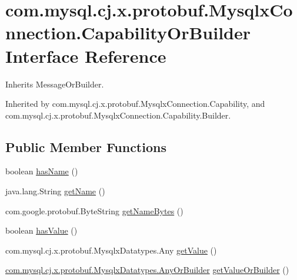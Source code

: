 \hypertarget{interfacecom_1_1mysql_1_1cj_1_1x_1_1protobuf_1_1_mysqlx_connection_1_1_capability_or_builder}{}\section{com.\+mysql.\+cj.\+x.\+protobuf.\+Mysqlx\+Connection.\+Capability\+Or\+Builder Interface Reference}
\label{interfacecom_1_1mysql_1_1cj_1_1x_1_1protobuf_1_1_mysqlx_connection_1_1_capability_or_builder}


Inherits Message\+Or\+Builder.



Inherited by com.\+mysql.\+cj.\+x.\+protobuf.\+Mysqlx\+Connection.\+Capability, and com.\+mysql.\+cj.\+x.\+protobuf.\+Mysqlx\+Connection.\+Capability.\+Builder.

\subsection*{Public Member Functions}
\begin{DoxyCompactItemize}
\item 
boolean \mbox{\hyperlink{interfacecom_1_1mysql_1_1cj_1_1x_1_1protobuf_1_1_mysqlx_connection_1_1_capability_or_builder_ab6029634c32ec1392c7159917287f600}{has\+Name}} ()
\item 
java.\+lang.\+String \mbox{\hyperlink{interfacecom_1_1mysql_1_1cj_1_1x_1_1protobuf_1_1_mysqlx_connection_1_1_capability_or_builder_ab90f1a177b8f6d6d436e4036b00b7c02}{get\+Name}} ()
\item 
com.\+google.\+protobuf.\+Byte\+String \mbox{\hyperlink{interfacecom_1_1mysql_1_1cj_1_1x_1_1protobuf_1_1_mysqlx_connection_1_1_capability_or_builder_a65cf445525ef1757fd9f14e189bd029a}{get\+Name\+Bytes}} ()
\item 
boolean \mbox{\hyperlink{interfacecom_1_1mysql_1_1cj_1_1x_1_1protobuf_1_1_mysqlx_connection_1_1_capability_or_builder_a2666b4074174cde030a25274c7fda6fd}{has\+Value}} ()
\item 
com.\+mysql.\+cj.\+x.\+protobuf.\+Mysqlx\+Datatypes.\+Any \mbox{\hyperlink{interfacecom_1_1mysql_1_1cj_1_1x_1_1protobuf_1_1_mysqlx_connection_1_1_capability_or_builder_aa200637a0d95b8e9bd38f54033dc9576}{get\+Value}} ()
\item 
\mbox{\hyperlink{interfacecom_1_1mysql_1_1cj_1_1x_1_1protobuf_1_1_mysqlx_datatypes_1_1_any_or_builder}{com.\+mysql.\+cj.\+x.\+protobuf.\+Mysqlx\+Datatypes.\+Any\+Or\+Builder}} \mbox{\hyperlink{interfacecom_1_1mysql_1_1cj_1_1x_1_1protobuf_1_1_mysqlx_connection_1_1_capability_or_builder_a61f2d147110b1020b918adbb742520c2}{get\+Value\+Or\+Builder}} ()
\end{DoxyCompactItemize}


